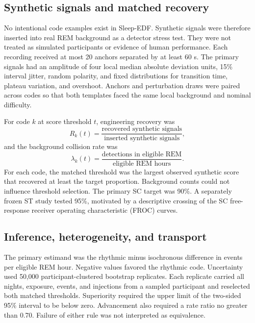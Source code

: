 \documentclass[10pt,twocolumn]{article}
\begin{document}
\subsection{Synthetic signals and matched recovery}

No intentional code examples exist in Sleep-EDF. Synthetic signals were therefore inserted into real REM background as a detector stress test. They were not treated as simulated participants or evidence of human performance. Each recording received at most 20 anchors separated by at least 60 s. The primary signals had an amplitude of four local median absolute deviation units, 15\% interval jitter, random polarity, and fixed distributions for transition time, plateau variation, and overshoot. Anchors and perturbation draws were paired across codes so that both templates faced the same local background and nominal difficulty.

For code $k$ at score threshold $t$, engineering recovery was
\begin{equation}
R_k(t)=\frac{\text{recovered synthetic signals}}{\text{inserted synthetic signals}},
\end{equation}
and the background collision rate was
\begin{equation}
\lambda_k(t)=\frac{\text{detections in eligible REM}}{\text{eligible REM hours}}.
\end{equation}
For each code, the matched threshold was the largest observed synthetic score that recovered at least the target proportion. Background counts could not influence threshold selection. The primary SC target was 90\%. A separately frozen ST study tested 95\%, motivated by a descriptive crossing of the SC free-response receiver operating characteristic (FROC) curves.

\subsection{Inference, heterogeneity, and transport}

The primary estimand was the rhythmic minus isochronous difference in events per eligible REM hour. Negative values favored the rhythmic code. Uncertainty used 50,000 participant-clustered bootstrap replicates. Each replicate carried all nights, exposure, events, and injections from a sampled participant and reselected both matched thresholds. Superiority required the upper limit of the two-sided 95\% interval to be below zero. Advancement also required a rate ratio no greater than 0.70. Failure of either rule was not interpreted as equivalence.
\end{document}
